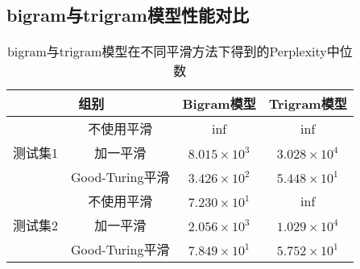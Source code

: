 \documentclass[twoside,11pt]{article}
\begin{document}
\subsection{bigram与trigram模型性能对比}
\begin{table}[htbp]
  \renewcommand{\multirowsetup}{\centering}
  \caption{bigram与trigram模型在不同平滑方法下得到的Perplexity中位数}
  \label{tab:hyperparams}
  \vspace{5pt}
  \centering
  \begin{tabular}{cccc}
    \toprule
    \multicolumn{2}{c}{组别} & Bigram模型      & Trigram模型                               \\
    \midrule
    \multirow{3}{*}{测试集1} & 不使用平滑      & inf                 & inf                 \\
                             & 加一平滑        & $8.015 \times 10^3$ & $3.028 \times 10^4$ \\
                             & Good-Turing平滑 & $3.426 \times 10^2$ & $5.448 \times 10^1$ \\
    \midrule
    \multirow{3}{*}{测试集2} & 不使用平滑      & $7.230 \times 10^1$ & inf                 \\
                             & 加一平滑        & $2.056\times 10^3$  & $1.029 \times 10^4$ \\
                             & Good-Turing平滑 & $7.849 \times 10^1$ & $5.752 \times 10^1$ \\
    \bottomrule
  \end{tabular}
\end{table}
\end{document}

